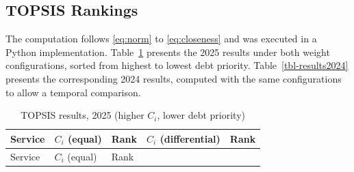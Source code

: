 \documentclass[
  authoryear,
  preprint]{elsarticle}
\begin{document}
\subsection{TOPSIS Rankings}\label{topsis-rankings}

The computation follows \eqref{eq:norm} to \eqref{eq:closeness} and was
executed in a Python implementation. Table~\ref{tbl-results2025}
presents the 2025 results under both weight configurations, sorted from
highest to lowest debt priority. Table~\ref{tbl-results2024} presents
the corresponding 2024 results, computed with the same configurations to
allow a temporal comparison.

\begin{longtable}[]{@{}
  >{\raggedright\arraybackslash}p{}
  >{\raggedleft\arraybackslash}p{}
  >{\raggedleft\arraybackslash}p{}
  >{\raggedleft\arraybackslash}p{}
  >{\raggedleft\arraybackslash}p{}@{}}
\caption{TOPSIS results, 2025 (higher \(C_i\), lower debt
priority)}\label{tbl-results2025}\tabularnewline
\toprule\noalign{}
\begin{minipage}[b]{\linewidth}\raggedright
Service
\end{minipage} & \begin{minipage}[b]{\linewidth}\raggedleft
\(C_i\) (equal)
\end{minipage} & \begin{minipage}[b]{\linewidth}\raggedleft
Rank
\end{minipage} & \begin{minipage}[b]{\linewidth}\raggedleft
\(C_i\) (differential)
\end{minipage} & \begin{minipage}[b]{\linewidth}\raggedleft
Rank
\end{minipage} \\
\midrule\noalign{}
\endfirsthead
\toprule\noalign{}
\begin{minipage}[b]{\linewidth}\raggedright
Service
\end{minipage} & \begin{minipage}[b]{\linewidth}\raggedleft
\(C_i\) (equal)
\end{minipage} & \begin{minipage}[b]{\linewidth}\raggedleft
Rank
\end{minipage} & \begin{minipage}[b]{\linewidth}\raggedleft

\end{minipage}
\end{longtable}
\end{document}
